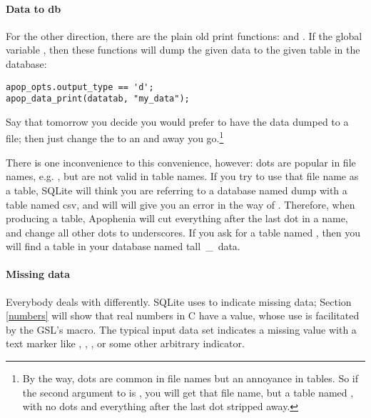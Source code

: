 \paragraph{Data to db} For the other direction, there are the plain old
print functions:  and
. If the global variable
, then these functions will dump the
given data to the given table in the database:
\begin{lstlisting}
apop_opts.output_type == 'd';
apop_data_print(datatab, "my_data");
\end{lstlisting}
Say that tomorrow you decide you would prefer to have the data dumped to
a file; then just change the  to an  and away you go.\footnote{By the way, dots are common in file names but an annoyance in tables. So if the second argument to  is , you will get that file name, but a table named , with no dots and everything after the last dot stripped away.}

There is one inconvenience to this convenience, however: dots are popular
in file names, e.g. , but are not valid in table names. If
you try to use that file name as a table, SQLite will think you are
referring to a database named \si{dump} with a table named \si{csv},
and will will give you an error in the way of .
Therefore, when producing a table, Apophenia will cut everything after
the last dot in a name, and change all other dots to underscores. If you
ask for a table named , then you will find a table in
your database named \si{tall\_data}.

\paragraph{Missing data} 
Everybody deals with  differently. SQLite uses 
 to indicate missing data; Section \ref{numbers} will show that
real numbers in C have a  value, whose use is facilitated by
the GSL's  macro. The typical input data set indicates a
missing value with a text marker like , , , or some
other arbitrary indicator.

